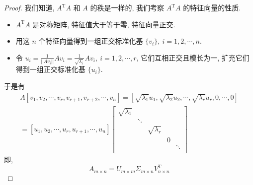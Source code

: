 \begin{proof}
  我们知道, $A^{\mathrm{T}} A$ 和 $A$ 的秩是一样的, 我们考察 $A^{\mathrm{T}}A$ 的特征向量的性质.

  \begin{itemize}
    \item $A^{\mathrm{T}}A$ 是对称矩阵, 特征值大于等于零, 特征向量正交.
    \item 用这 $n$ 个特征向量得到一组正交标准化基 $\{ v_i \}, \ i=1,2,\cdots,n$.
    \item 令 $ u_i = \frac{1}{||A v_i ||} A v_i = \frac{1}{\sqrt{\lambda_i}} A v_i,\ i=1,2,\cdots,r$, 它们互相正交且模长为一, 扩充它们得到一组正交标准化基 $\{ u_i \}$.
  \end{itemize}
  于是有
  \begin{equation}
    \begin{gathered}
      A \left[ v_1,v_2,\cdots,v_r, v_{r+1},v_{r+2},\cdots,v_n \right] = 
    \left[ \sqrt{\lambda_1} u_1, \sqrt{\lambda_2 }u_2,\cdots,\sqrt{\lambda_r}u_r, 0 , \cdots ,0\right] \\
    = \left[ u_1,u_2,\cdots,u_r, u_{r+1}, \cdots , u_n \right] \begin{bmatrix}
     \sqrt{\lambda_1} &  &  &  & \\
      & \ddots &  &  & \\
      &  & \sqrt{\lambda_r} &  & \\
      &  &  & 0 & \\
      &  &  &  & \ddots\\
    \end{bmatrix}
    \end{gathered}
  \end{equation}
  即, 
  \begin{equation}
    A_{m \times n} = U_{m \times  m} \Sigma_{m \times  n} V^{\mathrm{T}}_{n \times n}
  \end{equation}
\end{proof}